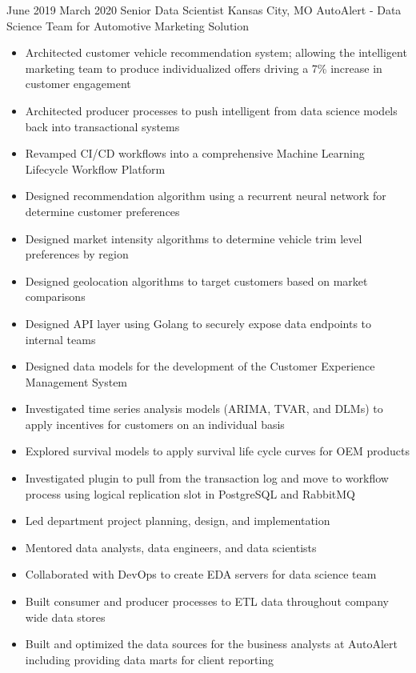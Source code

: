 \ProjectExperience
{June 2019}
{March 2020}
{Senior Data Scientist}
{Kansas City, MO}
{AutoAlert - Data Science Team for Automotive Marketing Solution}
{\begin{itemize}
    \item Architected customer vehicle recommendation system; allowing the intelligent marketing
    team to produce individualized offers driving a 7\% increase in customer engagement
    \item Architected producer processes to push intelligent from data science models back into
    transactional systems
    \item Revamped CI/CD workflows into a comprehensive Machine Learning Lifecycle Workflow
    Platform
\end{itemize}}
{\begin{itemize}
    \item Designed recommendation algorithm using a recurrent neural network for determine
    customer preferences
    \item Designed market intensity algorithms to determine vehicle trim level preferences by
    region
    \item Designed geolocation algorithms to target customers based on market comparisons
    \item Designed API layer using Golang to securely expose data endpoints to internal teams
    \item Designed data models for the development of the Customer Experience Management System
    \item Investigated time series analysis models (ARIMA, TVAR, and DLMs) to apply incentives for
    customers on an individual basis
    \item Explored survival models to apply survival life cycle curves for OEM products
    \item Investigated plugin to pull from the transaction log and move to workflow process using
    logical replication slot in PostgreSQL and RabbitMQ
\end{itemize}}
{\begin{itemize}
    \item Led department project planning, design, and implementation
    \item Mentored data analysts, data engineers, and data scientists
    \item Collaborated with DevOps to create EDA servers for data science team
    \item Built consumer and producer processes to ETL data throughout company wide data stores
    \item Built and optimized the data sources for the business analysts at AutoAlert including
    providing data marts for client reporting
\end{itemize}}

